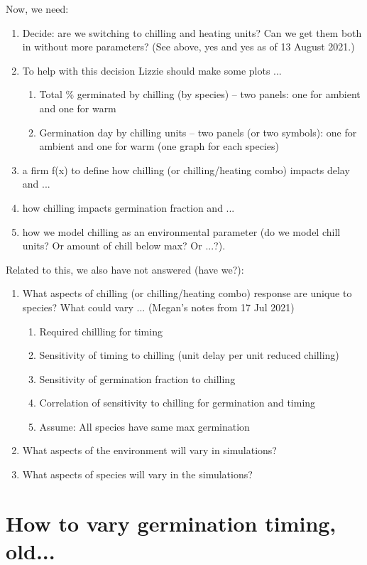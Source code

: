 \documentclass[11pt,letter]{article}
\begin{document}
Now, we need:
\begin{enumerate}
\item Decide: are we switching to chilling and heating units? Can we get them both in without more parameters? (See above, yes and yes as of 13 August 2021.)
\item To help with this decision Lizzie should make some plots ... 
\begin{enumerate}
\item Total \% germinated by chilling (by species)  -- two panels: one for ambient and one for warm
\item Germination day by chilling units -- two panels (or two symbols): one for ambient and one for warm (one graph for each species)
\end{enumerate}
\item a firm f(x) to define how chilling (or chilling/heating combo) impacts delay and ...
\item how chilling impacts germination fraction and ...
\item how we model chilling as an environmental parameter (do we model chill units? Or amount of chill below max? Or ...?). 
\end{enumerate}

Related to this, we also have not answered (have we?):
\begin{enumerate}
\item What aspects of chilling (or chilling/heating combo) response are unique to species? What could vary ... (Megan's notes from 17 Jul 2021)
\begin{enumerate}
\item Required chillling for timing
\item Sensitivity of timing to chilling (unit delay per unit reduced chilling)
\item Sensitivity of germination fraction to chilling
\item Correlation of sensitivity to chilling for germination and timing
\item Assume: All species have same max germination
\end{enumerate}
\item What aspects of the environment will vary in simulations?
\item What aspects of species will vary in the simulations?
\end{enumerate}


\section{How to vary germination timing, old...} 
\end{document}
